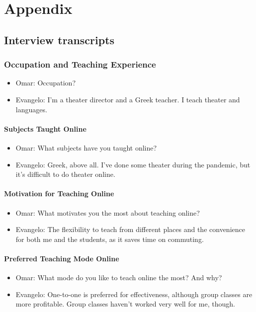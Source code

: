 \chapter{Appendix}\label{ch:appendix}

\section{Interview transcripts}\label{sec:interview-transcripts}

\subsection*{Occupation and Teaching Experience}
\begin{itemize}
\item Omar: Occupation?
\item Evangelo: I'm a theater director and a Greek teacher. I teach theater and languages.
\end{itemize}

\subsubsection*{Subjects Taught Online}
\begin{itemize}
\item Omar: What subjects have you taught online?
\item Evangelo: Greek, above all. I’ve done some theater during the pandemic, but it’s difficult to do theater online.
\end{itemize}

\subsubsection*{Motivation for Teaching Online}
\begin{itemize}
\item Omar: What motivates you the most about teaching online?
\item Evangelo: The flexibility to teach from different places and the convenience for both me and the students, as it saves time on commuting.
\end{itemize}

\subsubsection*{Preferred Teaching Mode Online}
\begin{itemize}
\item Omar: What mode do you like to teach online the most? And why?
\item Evangelo: One-to-one is preferred for effectiveness, although group classes are more profitable. Group classes haven’t worked very well for me, though.
\end{itemize}

